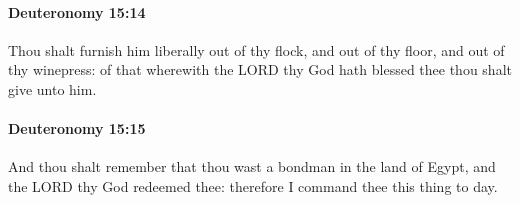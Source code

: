 		\paragraph{Deuteronomy 15:14} %
			\label{DEUTERONOMY-15-14}

			Thou shalt furnish him liberally out of thy flock, and out of thy floor, and out of thy winepress: of that wherewith the LORD thy God hath blessed thee thou shalt give unto him.


		\paragraph{Deuteronomy 15:15} %
			\label{DEUTERONOMY-15-15}

			And thou shalt remember that thou wast a bondman in the land of Egypt, and the LORD thy God redeemed thee: therefore I command thee this thing to day.


